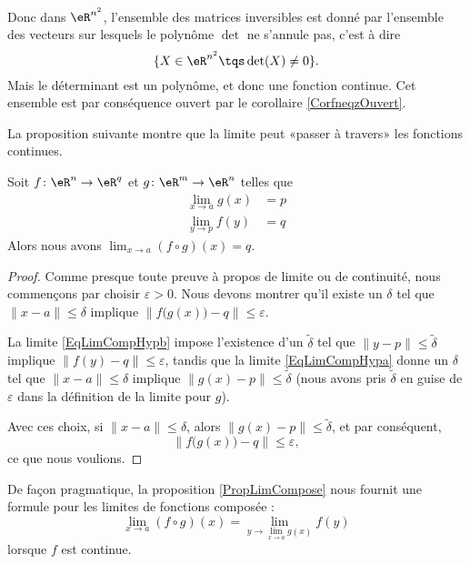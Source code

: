 \begin{example}
	Donc dans $\eR^{n^2}$, l'ensemble des matrices inversibles est donné par l'ensemble des vecteurs sur lesquels le polynôme $\det$ ne s'annule pas, c'est à dire
	\begin{equation}
		\{ X\in\eR^{n^2}\tqs \det(X)\neq 0 \}.
	\end{equation}
	Mais le déterminant est un polynôme, et donc une fonction continue. Cet ensemble est par conséquence ouvert par le corollaire \ref{CorfneqzOuvert}.
\end{example}



La proposition suivante montre que la limite peut «passer à travers» les fonctions continues.
\begin{proposition}		\label{PropLimCompose}
	Soit $f\colon \eR^n\to \eR^q$ et $g\colon \eR^m\to \eR^n$ telles que
	\begin{subequations}
		\begin{align}
			\lim_{x\to a} g(x)&= p		\label{EqLimCompHypa}\\
			\lim_{y\to p} f(y)&= q		\label{EqLimCompHypb}
		\end{align}
	\end{subequations}
	Alors nous avons $\lim_{x\to a} (f\circ g)(x)=q$. 
\end{proposition}

\begin{proof}
	Comme presque toute preuve à propos de limite ou de continuité, nous commençons par choisir $\varepsilon>0$. Nous devons montrer qu'il existe un $\delta$ tel que $\| x-a \|\leq \delta$ implique $\| f\big( g(x) \big)-q \|\leq \varepsilon$.

	La limite \eqref{EqLimCompHypb} impose l'existence d'un $\tilde\delta$ tel que $\| y-p \|\leq\tilde\delta$ implique $\| f(y)-q \|\leq\varepsilon$, tandis que la limite \eqref{EqLimCompHypa} donne un $\delta$ tel que $\| x-a \|\leq\delta$ implique $\| g(x)-p \|\leq\tilde\delta$ (nous avons pris $\tilde\delta$ en guise de $\varepsilon$ dans la définition de la limite pour $g$).

	Avec ces choix, si $\| x-a \|\leq \delta$, alors $\| g(x)-p \|\leq\tilde\delta$, et par conséquent,
	\begin{equation}
		\| f\big( g(x) \big)-q \|\leq\varepsilon,
	\end{equation}
	ce que nous voulions.
\end{proof}

De façon pragmatique, la proposition \ref{PropLimCompose} nous fournit une formule pour les limites de fonctions composée :
\begin{equation}		\label{Eqlimfgvomp}
	\lim_{x\to a} (f\circ g)(x)=\lim_{y\to \lim_{x\to a} g(x)}f(y)
\end{equation}
lorsque $f$ est continue.

